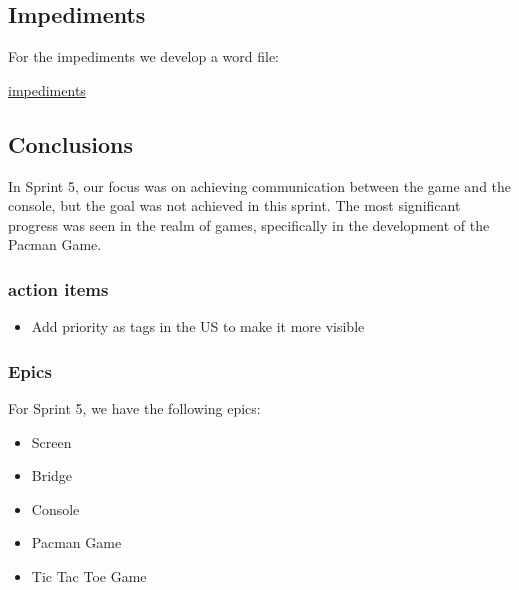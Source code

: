 \subsection{Impediments}
For the impediments we develop a word file:

\href{https://docs.google.com/spreadsheets/d/1S3ndUFktff6ETyNhOyirIFNed71W4ApTLGyjX8xSzUQ/edit?usp=sharing}{impediments}

\subsection{Conclusions}

In Sprint 5, our focus was on achieving communication between the game and the console, but the goal was not achieved in this sprint. The most significant progress was seen in the realm of games, specifically in the development of the Pacman Game.

\subsubsection{action items}

\begin{itemize}
    \item Add priority as tags in the US to make it more visible
\end{itemize}


\subsubsection{Epics}

For Sprint 5, we have the following epics:

\begin{itemize}
    \item Screen
    \item Bridge
    \item Console
    \item Pacman Game
    \item Tic Tac Toe Game
\end{itemize}